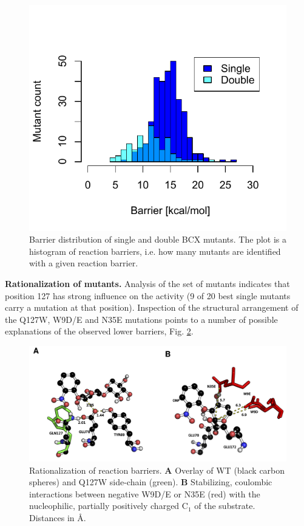 \begin{figure}[htbp] 
\centering
\includegraphics[width=0.95\linewidth]{barrier-distribution.pdf}
\caption{
Barrier distribution of single and double BCX mutants\cite{hediger2013computational}.
The plot is a histogram of reaction barriers, i.e. how many mutants are identified with a given reaction barrier.
}
\label{fig:bcx_barrier_distribution}
\end{figure}
\newline
\textbf{Rationalization of mutants.}
Analysis of the set of mutants indicates that position 127 has strong influence on the activity (9 of 20 best single mutants carry a mutation at that position).
Inspection of the structural arrangement of the Q127W, W9D/E and N35E mutations points to a number of possible explanations of the observed lower barriers, Fig. \ref{fig:bcx_rationalization}.
\begin{figure}[htbp] 
\centering
\includegraphics[width=0.99\linewidth]{analyse-charge.png}
\caption{
Rationalization of reaction barriers.
\textbf{A} Overlay of WT (black carbon spheres) and Q127W side-chain (green).
\textbf{B} Stabilizing, coulombic interactions between negative W9D/E or N35E (red) with the nucleophilic, partially positively charged C$_1$ of the substrate.
Distances in \AA\cite{hediger2013computational}.
}
\label{fig:bcx_rationalization}
\end{figure}
